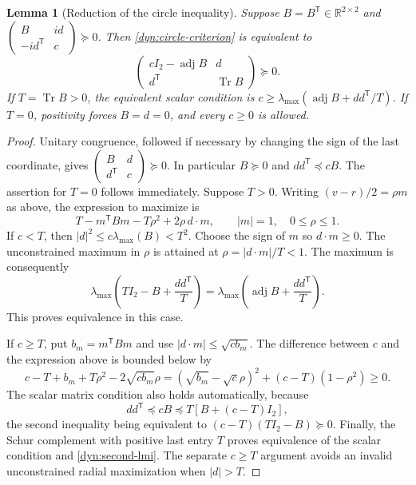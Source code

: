 \documentclass[reqno]{amsart}
\newtheorem{lemma}[theorem]{Lemma}
\theoremstyle{definition}
\theoremstyle{remark}
\newcommand{\R}{\mathbb R}
\DeclareMathOperator{\Tr}{Tr}
\begin{document}
\begin{lemma}[Reduction of the circle inequality]\label{dyn:lmi-reduction}
Suppose $B=B^{\mathsf T}\in\R^{2\times2}$ and
$\left(\begin{smallmatrix}B&i d\\-i d^{\mathsf T}&c\end{smallmatrix}\right)\succeq0$.
Then \eqref{dyn:circle-criterion} is equivalent to
\begin{equation}\label{dyn:second-lmi}
 \begin{pmatrix}cI_2-\operatorname{adj}B&d\\d^{\mathsf T}&\Tr B\end{pmatrix}
 \succeq0.
\end{equation}
If $T=\Tr B>0$, the equivalent scalar condition is
$c\ge\lambda_{\max}(\operatorname{adj}B+dd^{\mathsf T}/T)$.
If $T=0$, positivity forces $B=d=0$, and every $c\ge0$ is allowed.
\end{lemma}

\begin{proof}
Unitary congruence, followed if necessary by changing the sign of the last
coordinate, gives
$\left(\begin{smallmatrix}B&d\\d^{\mathsf T}&c\end{smallmatrix}\right)\succeq0$.
In particular $B\succeq0$ and $dd^{\mathsf T}\preceq cB$.
The assertion for $T=0$ follows immediately.  Suppose $T>0$.
Writing $(v-r)/2=\rho m$ as above, the expression to maximize is
\[
 T-m^{\mathsf T}Bm-T\rho^2+2\rho\,d\cdot m,
 \qquad |m|=1,\quad0\le\rho\le1.
\]
If $c<T$, then $|d|^2\le c\lambda_{\max}(B)<T^2$.
Choose the sign of $m$ so $d\cdot m\ge0$.
The unconstrained maximum in $\rho$ is attained at
$\rho=|d\cdot m|/T<1$.  The maximum is consequently
\[
 \lambda_{\max}\left(TI_2-B+\frac{dd^{\mathsf T}}T\right)
 =\lambda_{\max}\left(\operatorname{adj}B+\frac{dd^{\mathsf T}}T\right).
\]
This proves equivalence in this case.

If $c\ge T$, put $b_m=m^{\mathsf T}Bm$ and use
$|d\cdot m|\le\sqrt{cb_m}$.  The difference between $c$ and the expression
above is bounded below by
\[
 c-T+b_m+T\rho^2-2\sqrt{cb_m}\rho
 =(\sqrt{b_m}-\sqrt c\rho)^2+(c-T)(1-\rho^2)\ge0.
\]
The scalar matrix condition also holds automatically, because
\[
 dd^{\mathsf T}\preceq cB\preceq T[B+(c-T)I_2],
\]
the second inequality being equivalent to
$(c-T)(TI_2-B)\succeq0$.
Finally, the Schur complement with positive last entry $T$ proves
equivalence of the scalar condition and \eqref{dyn:second-lmi}.
The separate $c\ge T$ argument avoids an invalid unconstrained radial
maximization when $|d|>T$.
\end{proof}
\end{document}
